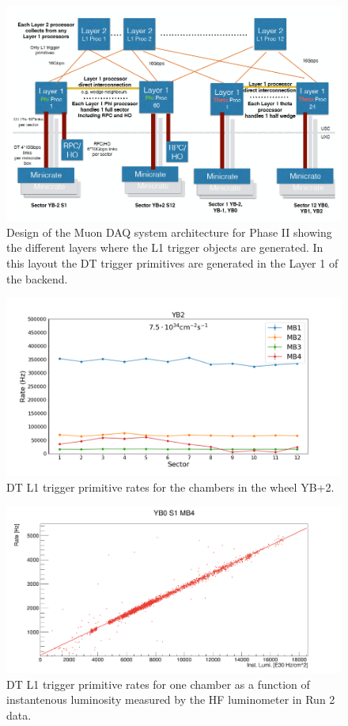 \begin{figure}[hbtp]
\centering
\includegraphics[width=.65\linewidth]{tex/Part2/fig/DT/DT-DAQoverview.png}
\caption{Design  of the Muon DAQ system architecture for Phase II showing the different layers where the L1 trigger objects are generated. In  this layout the DT trigger primitives are generated in the Layer 1 of the backend.}   
\label{fig:DT_DAQ}
\end{figure}


\begin{figure}[hbtp]
\centering
\includegraphics[width=.7\linewidth]{tex/Part2/fig/DT/DT-RatesExtrapolated.png}
\caption{DT L1 trigger primitive rates for the chambers in the wheel YB+2.} 
\label{fig:DT_rates}
\end{figure}


\begin{figure}[hbtp]
\centering
\includegraphics[width=.7\linewidth]{tex/Part2/fig/DT/DT-Linearity.png}
\caption{DT L1 trigger primitive rates for one chamber  as a function of instantenous luminosity measured by the HF luminometer in Run 2 data.} 
\label{fig:DT_linearity}
\end{figure}
